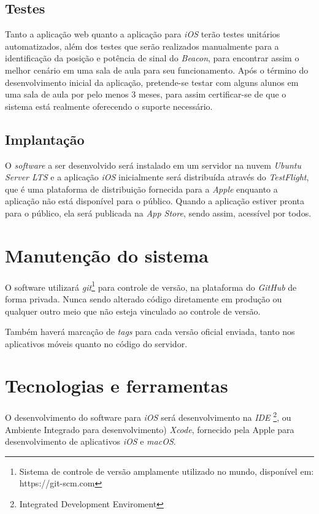\documentclass[
	12pt,
	oneside,
	a4paper,
	english,
	brazil,
]{abntex2}
\begin{document}
\subsection{Testes}

Tanto a aplicação web quanto a aplicação para \emph{iOS} terão testes unitários automatizados, além dos testes que serão realizados manualmente para a identificação da posição e potência de sinal do \emph{Beacon}, para encontrar assim o melhor cenário em uma sala de aula para seu funcionamento. Após o término do desenvolvimento inicial da aplicação, pretende-se testar com alguns alunos em uma sala de aula por pelo menos 3 meses, para assim certificar-se de que o sistema está realmente oferecendo o suporte necessário.

\subsection{Implantação}

O \emph{software} a ser desenvolvido será instalado em um servidor na nuvem \emph{Ubuntu Server LTS} e a aplicação \emph{iOS} inicialmente será distribuída através do \emph{TestFlight}, que é uma plataforma de distribuição fornecida para a \emph{Apple} enquanto a aplicação não está disponível para o público. Quando a aplicação estiver pronta para o público, ela será publicada na \emph{App Store}, sendo assim, acessível por todos.

\section{Manutenção do sistema}

O software utilizará \emph{git}\footnote{Sistema de controle de versão amplamente utilizado no mundo, disponível em: https://git-scm.com} para controle de versão, na plataforma do \emph{GitHub} de forma privada. Nunca sendo alterado código diretamente em produção ou qualquer outro meio que não esteja vinculado ao controle de versão.

Também haverá marcação de \emph{tags} para cada versão oficial enviada, tanto nos aplicativos móveis quanto no código do servidor.

\section{Tecnologias e ferramentas}

O desenvolvimento do software para \emph{iOS} será desenvolvimento na \emph{IDE} \footnote{Integrated Development Enviroment}, ou Ambiente Integrado para desenvolvimento) \emph{Xcode}, fornecido pela Apple para desenvolvimento de aplicativos \emph{iOS} e \emph{macOS}.
\end{document}
